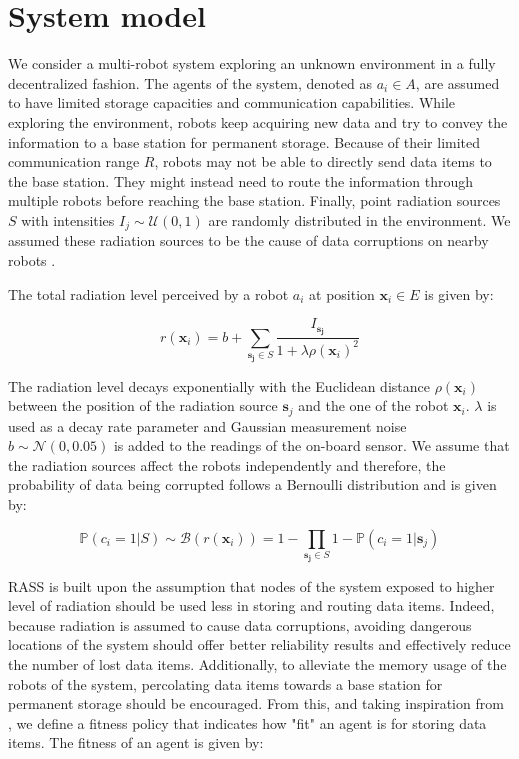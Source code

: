 \section{System model}
We consider a multi-robot system exploring an unknown environment in a fully decentralized fashion. The agents of the system, denoted as $a_i \in A$, are assumed to have limited storage capacities and communication capabilities. While exploring the environment, robots keep acquiring new data and try to convey the information to a base station for permanent storage. Because of their limited communication range $R$, robots may not be able to directly send data items to the base station. They might instead need to route the information through multiple robots before reaching the base station. Finally, point radiation sources $S$ with intensities $I_j\sim\mathcal{U}(0, 1)$ are randomly distributed in the environment. We assumed these radiation sources to be the cause of data corruptions on nearby robots \cite{sharp1996radiation,messenger1986effects}.  

The total radiation level perceived by a robot $a_i$ at position $\bm{x}_i \in E$ is given by:

\begin{equation}
    r(\bm{x}_i) = b + \sum_{\bm{s_j} \in S} \frac{I_{\bm{s_j}}}{1 + \lambda\rho(\bm{x}_i)^2}
    \label{eq:radiation}
\end{equation}

The radiation level decays exponentially with the Euclidean distance $\rho(\bm{x}_i)$ between the position of the radiation source $\bm{s}_j$ and the one of the robot $\bm{x}_i$. $\lambda$ is used as a decay rate parameter and Gaussian measurement noise
$b \sim \mathcal{N}(0, 0.05)$ is added to the readings of the on-board sensor. We assume that the radiation sources affect the robots independently and therefore, the probability of data being corrupted follows a Bernoulli distribution and is given by:

\begin{equation}
    \mathbb{P}(c_i = 1 | S) \sim \mathcal{B}(r(\bm{x}_i)) = 1 - \prod_{\bm{s_j} \in S} 1 - \mathbb{P}(c_i = 1 | \bm{s}_j)
    \label{eq:failure}
\end{equation}


RASS is built upon the assumption that nodes of the system exposed to higher level of radiation should be used less in storing and routing data items. Indeed, because radiation is assumed to cause data corruptions, avoiding dangerous locations of the system should offer better reliability results and effectively reduce the number of lost data items. Additionally, to alleviate the memory usage of the robots of the system, percolating data items towards a base station for permanent storage should be encouraged. From this, and taking inspiration from \cite{majcherczykSwarmmesh2020}, we define a fitness policy that indicates how "fit" an agent is for storing data items. The fitness of an agent is given by:

